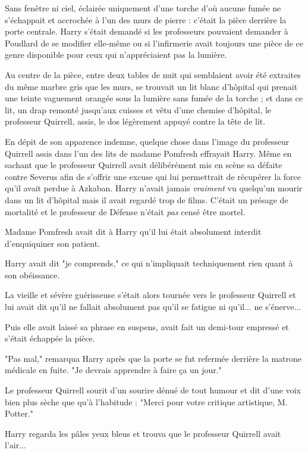 Sans fenêtre ni ciel, éclairée uniquement d'une torche d'où aucune fumée ne s'échappait et accrochée à l'un des murs de pierre : c'était la pièce derrière la porte centrale. Harry s'était demandé si les professeurs pouvaient demander à Poudlard de se modifier elle-même ou si l'infirmerie avait toujours une pièce de ce genre disponible pour ceux qui n'appréciaient pas la lumière.

Au centre de la pièce, entre deux tables de nuit qui semblaient avoir été extraites du même marbre gris que les murs, se trouvait un lit blanc d'hôpital qui prenait une teinte vaguement orangée sous la lumière sans fumée de la torche ; et dans ce lit, un drap remonté jusqu'aux cuisses et vêtu d'une chemise d'hôpital, le professeur Quirrell, assis, le dos légèrement appuyé contre la tête de lit.

En dépit de son apparence indemne, quelque chose dans l'image du professeur Quirrell assis dans l'un des lits de madame Pomfresh effrayait Harry. Même en sachant que le professeur Quirrell avait délibérément mis en scène sa défaite contre Severus afin de s'offrir une excuse qui lui permettrait de récupérer la force qu'il avait perdue à Azkaban. Harry n'avait jamais \emph{vraiment}  vu quelqu'un mourir dans un lit d'hôpital mais il avait regardé trop de films. C'était un présage de mortalité et le professeur de Défense n'était \emph{pas}  censé être mortel.

Madame Pomfresh avait dit à Harry qu'il lui était absolument interdit d'enquiquiner son patient.

Harry avait dit "je comprends," ce qui n'impliquait techniquement rien quant à son obéissance.

La vieille et sévère guérisseuse s'était alors tournée vers le professeur Quirrell et lui avait dit qu'il ne fallait absolument pas qu'il se fatigue ni qu'il... ne s'énerve...

Puis elle avait laissé sa phrase en suspens, avait fait un demi-tour empressé et s'était échappée la pièce.

"Pas mal," remarqua Harry après que la porte se fut refermée derrière la matrone médicale en fuite. "Je devrais apprendre à faire ça un jour."

Le professeur Quirrell sourit d'un sourire dénué de tout humour et dit d'une voix bien plus sèche que qu'à l'habitude : "Merci pour votre critique artistique, M. Potter."

Harry regarda les pâles yeux bleus et trouva que le professeur Quirrell avait l'air...

